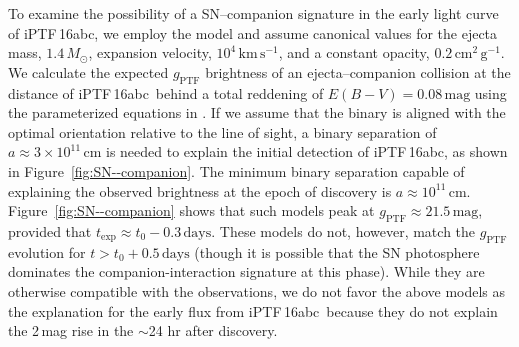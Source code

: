\documentclass[twocolumn]{aastex61}
\newcommand{\sm}{M_\odot}
\newcommand{\abc}{iPTF\,16abc}
\begin{document}
To examine the possibility of a SN--companion signature in the early light
curve of \abc, we employ the \citet{2010ApJ...708.1025K} model and assume
canonical values for the ejecta mass, $1.4\,\sm$, expansion velocity,
$10^{4}\,\textrm{km}\,\textrm{s}^{-1}$, and a constant opacity,
$0.2\,\textrm{cm}^2\,\textrm{g}^{-1}$. We calculate the expected
$g_\mathrm{PTF}$ brightness of an ejecta--companion collision at the
distance of \abc\ behind a total reddening of $E(B-V) = 0.08 \,
\mathrm{mag}$ using the parameterized equations in
\citet{2012ApJ...749...18B}. If we assume that the binary is aligned with
the optimal orientation relative to the line of sight, a binary separation
of $a \approx 3 \times 10^{11}\, \mathrm{cm}$ is needed to explain the
initial detection of \abc, as shown in Figure~\ref{fig:SN--companion}. The
minimum binary separation capable of explaining the observed brightness at
the epoch of discovery is $a \approx 10^{11} \, \mathrm{cm}$.
Figure~\ref{fig:SN--companion} shows that such models peak at
$g_\mathrm{PTF} \approx 21.5 \, \mathrm{mag}$, provided that $t_\mathrm{exp}
\approx t_0 - 0.3 \, \mathrm{days}$. These models do not, however, match the
$g_\mathrm{PTF}$ evolution for $t > t_0 + 0.5 \, \mathrm{days}$ (though it
is possible that the SN photosphere dominates the companion-interaction
signature at this phase). While they are otherwise compatible with the
observations, we do not favor the above models as the explanation for the
early flux from \abc\ because they do not explain the 2\,mag rise in the
$\sim$24 hr after discovery.
\end{document}
